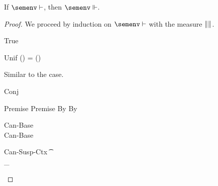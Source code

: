 \documentclass[acmsmall,screen,nonacm,review]{acmart}
\begin{document}
\begin{theorem}[Canonicalization]
  \label{thm:canonicalization}
  If $\semenv \th \c$, then $\semenv \Th \c$.
  \begin{proof}
  We proceed by induction on $\semenv \th \c$ with the measure ${\| \relax \|}$.
  \begin{proofcases}
    \proofcasederivation
      {True}
      {}
      {\semenv \th \ctrue}

      \begin{llproof}
\Hand 	{}
      \end{llproof}
    \proofcasederivation
      {Unif}
      {\semenv(\ta) = \semenv(\tb)}
      {\semenv \th \cunif \ta \tb}

      \begin{llproof}
	Similar to the  case.
      \end{llproof}
    \proofcasederivation
      {Conj}
      {\semenv \th \ca \\ \semenv \th \cb}
      {\semenv \th \ca \cand \cb}

      \begin{llproof}
	\vdashPf{\semenv}{\ca} {Premise}
	\vdashPf{\semenv}{\cb} {Premise}
	\VdashPf{\semenv}{\ca} {By \ih}
	\VdashPf{\semenv}{\cb} {By \ih}
	\decolumnizePf
	\casesPf{\semenv \Th \ca, \semenv \Th \cb}
      \end{llproof}

      \begin{proofcases}
	\proofcasederivationdouble
	  {Can-Base}
	  {\semenv \th \ca \\ \ca \simple}
	  {\semenv \Th \ca}
	  {Can-Base}
	  {\semenv \th \cb \\ \cb \simple}
	  {\semenv \Th \cb}

	  \begin{llproof}
	    \decolumnizePf
\Hand 	    {}

	  \end{llproof}

	\proofcasederivationdouble
	  {Can-Susp-Ctx}
	  {\Cshape \C \t \sh \\ \semenv \Th \C\where{\cmatched \t \sh \cbrs}}
	  {\semenv \Th \underbrace{\C\where{\cmatch \t \cbrs}}_\ca}
	  {}
	  {}
	  {\semenv \Th \cb}

	  \begin{llproof}


\end{llproof}
\end{proofcases}
\end{proofcases}
\end{proof}
\end{theorem}
\end{document}
